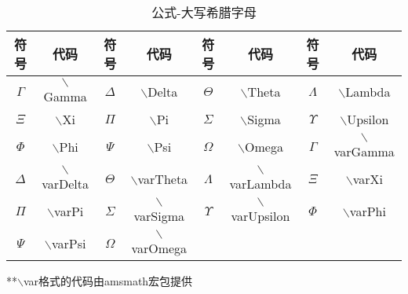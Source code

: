 \documentclass[UTF8,fontset=ubuntu]{ctexart}
\begin{document}
\begin{table}
\begin{tabular}{c c c c c c c c}
	\hline
	符号 & 代码 & 符号 & 代码 & 符号 & 代码 & 符号 & 代码\\
	\hline
	$\Gamma$ & $\backslash$Gamma & $\Delta$ & $\backslash$Delta & $\Theta$ & $\backslash$Theta & $\Lambda$ & $\backslash$Lambda\\
	$\Xi$ & $\backslash$Xi & $\Pi$ & $\backslash$Pi & $\Sigma$ & $\backslash$Sigma & $\Upsilon$ & $\backslash$Upsilon\\
	$\Phi$ & $\backslash$Phi & $\Psi$ & $\backslash$Psi & $\Omega$ & $\backslash$Omega & $\varGamma$ & $\backslash$varGamma\\
	$\varDelta$ & $\backslash$varDelta & $\varTheta$ & $\backslash$varTheta & $\varLambda$ & $\backslash$varLambda & $\varXi$ & $\backslash$varXi\\
	$\varPi$ & $\backslash$varPi & $\varSigma$ & $\backslash$varSigma & $\varUpsilon$ & $\backslash$varUpsilon & $\varPhi$ & $\backslash$varPhi\\
	$\varPsi$ & $\backslash$varPsi & $\varOmega$ & $\backslash$varOmega\\
\end{tabular}
**$\backslash$var格式的代码由amsmath宏包提供
\caption{公式-大写希腊字母}
\end{table}
\end{document}
